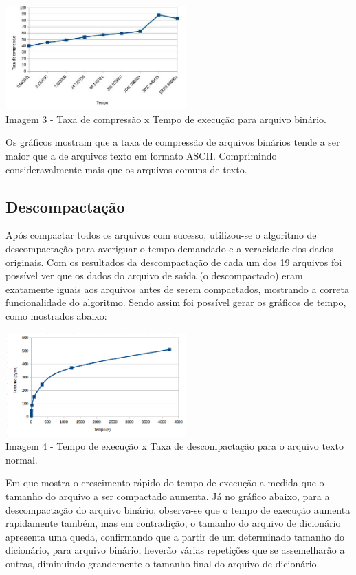 \documentclass[
	article,			
	11pt,				
	oneside,			
	a4paper,			
	english,			
	brazil,				
	sumario=tradicional
	]{abntex2}
\begin{document}
\begin{center}
	\includegraphics[width=7cm,height=4cm]{Binario.jpg}\\
	Imagem 3 - Taxa de compressão x Tempo de execução para arquivo binário.
\end{center}

Os gráficos mostram que a taxa de compressão de arquivos binários tende a ser maior que a de arquivos texto em formato ASCII. Comprimindo consideravalmente mais que os arquivos comuns de texto.

\subsection{Descompactação}
Após compactar todos os arquivos com sucesso, utilizou-se o algoritmo de descompactação para averiguar o tempo demandado e a veracidade dos dados originais. Com os resultados da descompactação de cada um dos 19 arquivos foi possível ver que os dados do arquivo de saída (o descompactado) eram exatamente iguais aos arquivos antes de serem compactados, mostrando a correta funcionalidade do algoritmo. Sendo assim foi possível gerar os gráficos de tempo, como mostrados abaixo:

\begin{center}
	\includegraphics[width=7cm,height=4cm]{UNTXT.png}\\
	Imagem 4 - Tempo de execução x Taxa de descompactação para o arquivo texto normal.
\end{center}

Em que mostra o crescimento rápido do tempo de execução a medida que o tamanho do arquivo a ser compactado aumenta. Já no gráfico abaixo, para a descompactação do arquivo binário, observa-se que o tempo de execução aumenta rapidamente também, mas em contradição, o tamanho do arquivo de dicionário apresenta uma queda, confirmando que a partir de um determinado tamanho do dicionário, para arquivo binário, heverão várias repetições que se assemelharão a outras, diminuindo grandemente o tamanho final do arquivo de dicionário.
\end{document}
